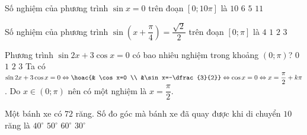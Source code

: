 \begin{ex}%
	Số nghiệm của phương trình $\sin x=0$ trên đoạn $[0 ; 10 \pi]$ là
	\choice
	{$10$}
	{$6$}
	{$5$}
	{\True $11$}
\end{ex}

\begin{ex}%
	Số nghiệm của phương trình $\sin \left(x+\dfrac{\pi}{4}\right)=\dfrac{\sqrt{2}}{2}$ trên đoạn $[0; \pi]$ là
	\choice
	{$4$}
	{$1$}
	{\True $2$}
	{$3$}
\end{ex}
\begin{ex}%
	Phương trình $ \sin{2x}+3\cos x=0 $ có bao nhiêu nghiệm trong khoảng $ (0;\pi)$?
	\choice
	{$ 0 $}
	{\True $ 1 $}
	{$ 2 $}
	{$ 3 $}
	\loigiai
	{
		Ta có $ \sin{2x}+3\cos x=0 \Leftrightarrow \hoac{& \cos x=0 \\ &\sin x=-\dfrac{3}{2}}\Leftrightarrow \cos x=0 \Leftrightarrow x= \dfrac{\pi}{2}+k\pi$. Do $ x \in (0;\pi) $ nên có một nghiệm là $ x=\dfrac{\pi}{2}$.
	}
\end{ex}

\begin{ex}%
	Một bánh xe có $72$ răng. Số đo góc mà bánh xe đã quay được khi di chuyển $10$ răng là
	\choice
	{$40^\circ	$}
	{\True $50^\circ$}
	{$60^\circ$}
	{$30^\circ$}
\end{ex}

